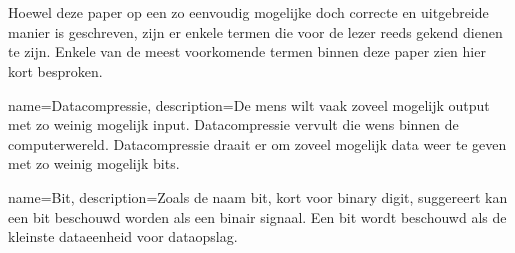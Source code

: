 \chapter{}
\label{ch:stand-van-zaken}

Hoewel deze paper op een zo eenvoudig mogelijke doch correcte en uitgebreide manier is geschreven, zijn er enkele termen die voor de lezer reeds gekend dienen te zijn. Enkele van de meest voorkomende termen binnen deze paper zien hier kort besproken.




{
	name={Datacompressie},
	description={De mens wilt vaak zoveel mogelijk output met zo weinig mogelijk input. Datacompressie vervult die wens binnen de computerwereld. Datacompressie draait er om zoveel mogelijk data weer te geven met zo weinig mogelijk bits.}
}

{
	name={Bit},
	description={Zoals de naam bit, kort voor binary digit, suggereert kan een bit beschouwd worden als een binair signaal. Een bit wordt beschouwd als de kleinste dataeenheid voor dataopslag. }
}



\glsaddall
\printglossary[title=Woordenlijst]
